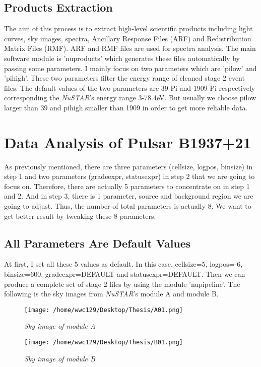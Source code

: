 \documentclass[12pt]{report}
\begin{document}
    \subsection{Products Extraction}
        The aim of this process is to extract high-level scientific products including light curves, sky images,
        spectra, Ancillary Response Files (ARF) and Redistribution Matrix Files (RMF). ARF and RMF files are used 
        for spectra analysis. The main software module is 'nuproducts' which generates these files automatically by 
        passing some parameters. I mainly focus on two parameters which are 'pilow' and 'pihigh'. These two 
        parameters filter the energy range of cleaned stage 2 event files. The default values of the two parameters
        are 39 Pi and 1909 Pi respectively corresponding the \textit{NuSTAR}'s energy range 3-78.4eV. But usually we choose 
        pilow larger than 39 and pihigh smaller than 1909 in order to get more reliable data.
                

    
    \section{Data Analysis of Pulsar B1937+21}
        As previously mentioned, there are three parameters (cellsize, logpos, binsize) in step 1 and two 
        parameters (gradeexpr, statusexpr) in step 2 that we are going to focus on. 
        Therefore, there are actually 5 parameters to concentrate on in step 1 and 2. And in step 3, there is 1 
        parameter, source and background region we are going to adjust. Thus, the number of total parameters is
        actually 8. We want to get better result by tweaking these 8 parameters.\\
        \subsection{All Parameters Are Default Values}
          \indent 
          At first, I set all these 5 values as default.  
          In this case, cellsize=5, logpos=-6, binsize=600, gradeexpr=DEFAULT and statusexpr=DEFAULT.
          Then we can produce a complete set of stage 2 files by using the module 'nupipeline'. The following is 
          the sky images from \textit{NuSTAR}'s module A and module B. 
        \begin{figure}[h]
          \hspace{0.7cm}
          \begin{minipage}{0.45\textwidth} 
            \centering 
            \texttt{[image: /home/wwc129/Desktop/Thesis/A01.png]}
            \caption{\textit{\footnotesize Sky image of module A}}
          \end{minipage}
          \hspace{0.1cm} 
          \begin{minipage}{0.45\textwidth}
            \centering 
            \texttt{[image: /home/wwc129/Desktop/Thesis/B01.png]}
            \caption{\textit{\footnotesize Sky image of module B}}
          \end{minipage}
        \end{figure}
      
\end{document}
